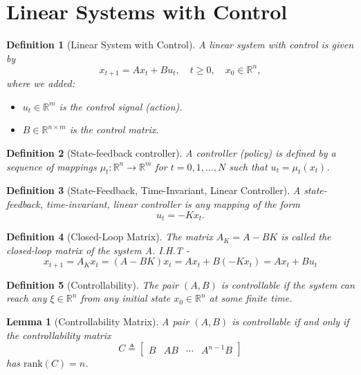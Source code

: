 \documentclass[a4 paper]{article}
\numberwithin{equation}{section}
\theoremstyle{boldStyle}
\theoremstyle{boldBlueStyle}
\newtheorem{lemma}{Lemma}[section]
\theoremstyle{boldPurpleStyle}
\theoremstyle{boldRedStyle}
\newtheorem{definition}{Definition}[section]
\theoremstyle{boldGreenStyle}
\begin{document}
\section{Linear Systems with Control}

\begin{definition}[Linear System with Control]
  A linear system with control is given by
  \begin{equation}
      x_{t+1} = A x_t + B u_t, \quad t \geq 0, \quad x_0 \in \mathbb{R}^n,
  \end{equation}
  where we added:
  \begin{itemize}
      \item \( u_t \in \mathbb{R}^m \) is the control signal (action).
      \item \( B \in \mathbb{R}^{n \times m} \) is the control matrix.
  \end{itemize}
\end{definition}

\begin{definition}[State-feedback controller]
  A controller (policy) is defined by a sequence of mappings \( \mu_t : \mathbb{R}^n \to \mathbb{R}^m \) 
  for \( t = 0, 1, \ldots, N \) such that \( u_t = \mu_t(x_t) \).  
\end{definition}
  

\begin{definition}[State-Feedback, Time-Invariant, Linear Controller]
A state-feedback, time-invariant, linear controller is any mapping of the form
\[
u_t = -K x_t.
\]
\end{definition}

\begin{definition}[Closed-Loop Matrix]
  The matrix $A_K = A - BK$ is called the closed-loop matrix of the system A. I.H.T -
  \[
    x_{t+1} = A_Kx_t = (A - BK)x_t = Ax_t + B(-Kx_t) = Ax_t + Bu_t
  \]
\end{definition}


\begin{definition}[Controllability]
  The pair \( (A, B) \) is \textit{controllable} if the system can reach any \( \xi \in \mathbb{R}^n \) from any initial state \( x_0 \in \mathbb{R}^n \) at some finite time.
\end{definition}

\begin{lemma}[Controllability Matrix]
  A pair \( (A, B) \) is controllable if and only if the \textit{controllability matrix}
  \[
  C \triangleq \begin{bmatrix} B & AB & \cdots & A^{n-1}B \end{bmatrix}
  \]
  has \( \text{rank}(C) = n \).
\end{lemma}
\end{document}
